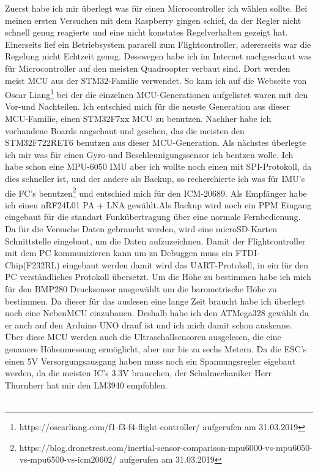 \documentclass[12pt,a4paper, ngerman]{article}
\begin{document}
Zuerst habe ich mir überlegt was für einen Microcontroller ich wählen sollte. Bei meinen ersten Versuchen mit dem Raspberry gingen schief, da der Regler nicht schnell genug reagierte und eine nicht konstates Regelverhalten gezeigt hat. Einerseits lief ein Betriebsystem pararell zum Flightcontroller, adererseits war die Regelung nicht Echtzeit genug. Desswegen habe ich im Internet nachgeschaut was für Microcontroller auf den meisten Quadroopter verbaut sind. Dort werden  meist MCU aus der STM32-Familie verwendet. So kam ich auf die Webseite von Oscar Liang\footnote{\label{foot:1}https://oscarliang.com/f1-f3-f4-flight-controller/ aufgerufen am 31.03.2019} bei der die einzelnen MCU-Generationen aufgelistet waren mit den Vor-und Nachteilen. Ich entschied mich für die neuste Generation aus dieser MCU-Familie, einen STM32F7xx MCU zu benutzen. Nachher habe ich vorhandene Boards angschaut und gesehen, das die meisten den STM32F722RET6 benutzen aus dieser MCU-Generation. Als nächstes überlegte ich mir was für einen Gyro-und Beschleunigungssensor ich bentzen wolle. Ich habe schon eine MPU-6050 IMU aber ich wollte noch einen mit SPI-Protokoll, da dies schneller ist, und der andere als Backup, so recherchierte ich was für IMU's die FC's benutzen\footnote{\label{foot:2}https://blog.dronetrest.com/inertial-sensor-comparison-mpu6000-vs-mpu6050-vs-mpu6500-vs-icm20602/ aufgerufen am 31.03.2019} und entschied mich für den ICM-20689. Als Empfänger habe ich einen nRF24L01 PA + LNA gewählt.Als Backup wird noch ein PPM Eingang eingebaut für die standart Funkübertragung über eine normale Fernbedienung. Da für die Versuche Daten gebraucht werden, wird eine microSD-Karten Schnittstelle eingebaut, um die Daten aufzuzeichnen. Damit der Flightcontroller mit dem PC kommunizieren kann um zu Debuggen muss ein FTDI-Chip(F232RL) eingebaut werden damit wird das UART-Protokoll, in ein für den PC verständliches Protokoll übersetzt. Um die Höhe zu bestimmen habe ich mich für den BMP280 Drucksensor ausgewählt um die barometrische Höhe zu bestimmen. Da dieser für das auslesen eine lange Zeit braucht habe ich überlegt noch eine NebenMCU einzubauen. Deshalb habe ich den ATMega328 gewählt da er auch auf den Arduino UNO drauf ist und ich mich damit schon auskenne. Über diese MCU werden auch die Ultraschallsensoren ausgelesen, die eine genauere Höhenmessung ermöglicht, aber nur bis zu sechs Metern. Da die ESC's einen 5V Versorgungsausgang haben muss noch ein Spannungsregler  eigebaut werden, da die meisten IC's 3.3V braucchen, der Schulmechaniker Herr Thurnherr hat mir den LM3940 empfohlen.\\ \\
\end{document}
